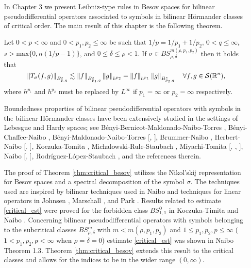 In Chapter 3 we present Leibniz-type rules in Besov spaces for bilinear pseudodifferential operators associated to symbols in bilinear H\"ormander classes of critical order. The main result of this chapter is the following theorem. 

\begin{theorem}\label{thm:critical_besov}
Let $0<p<\infty$ and $0<p_1,p_2\leq\infty$ be such that $1/p = 1/p_1 + 1/p_2$, $0<q\leq\infty$, $s>\text{max}\{0,n(1/p - 1)\}$, and $0\leq \delta\leq \rho <1$. If $\sigma\in BS^{m(\rho,p_1,p_2)}_{\rho,\delta}$ then it holds that 
\begin{equation}\label{critical_est}
\left\|T_\sigma(f,g)\right\|_{B^s_{p,q}} \lesssim \left\|f\right\|_{B^s_{p_1,q}} \left\|g\right\|_{h^{p_2}} + \left\|f\right\|_{h^{p_1}}\left\|g\right\|_{B^s_{p_2,q}} \quad \forall f,g\in\mathcal{S}({{\mathbb R}^n}),
\end{equation}
where $h^{p_1}$ and $h^{p_2}$ must be replaced by $L^\infty$ if $p_1 = \infty$ or $p_2 = \infty$ respectively. 
\end{theorem}

Boundedness properties of bilinear pseudodifferential operators with symbols
in the bilinear H\"ormander classes have been extensively studied in the settings of
Lebesgue and Hardy spaces; see B\'enyi-Bernicot-Maldonado-Naibo-Torres \citep{MR2660466}, B\'enyi-Chaffee-Naibo \citep{benyi2018strongly}, B\'enyi-Maldonado-Naibo-Torres [\citep{MR1986065}, \citep{MR2660466}], Brummer-Naibo \citep{MR3750234}, Herbert-Naibo [\citep{MR3627725}, \citep{MR3211086}], Koezuka-Tomita \citep{MR3750316}, Michalowski-Rule-Staubach \citep{MR3165300}, Miyachi-Tomita
[\citep{MR3179688}, \citep{miyachi2018bilinear}, \citep{miyachi2018bilinear2}], Naibo [\citep{MR3393696}, \citep{MR3411149}], Rodr\'iguez-L\'opez-Staubach \citep{MR3035059}, and the references therein.

The proof of Theorem \ref{thm:critical_besov} utilizes the Nikol'skij representation for Besov spaces and a spectral decomposition of the symbol $\sigma$. The techniques used are inspired by bilinear techniques used in Naibo \cite{MR3393696} and techniques for linear operators in Johnsen \citep{MR2163627}, Marschall \citep{MR1376592}, and Park \citep{Park}. Results related to estimate \ref{critical_est} were proved for the forbidden class $BS^0_{1,1}$ in Koezuka-Timita \cite{MR3750316} and Naibo \citep{MR3393696}. Concerning bilinear pseudodifferential operators with symbols belonging to the subcritical classes $BS^m_{\rho,\delta}$ with $m<m(\rho,p_1,p_2)$ and $1\leq p_1,p_2,p \leq \infty$ ($1 < p_1,p_2,p < \infty$ when $\rho = \delta = 0$) estimate \ref{critical_est} was shown in Naibo \citep{MR3393696} Theorem 1.3. Theorem \ref{thm:critical_besov} extends this result to the critical classes and allows for the indices to be in the wider range $(0,\infty)$. 

